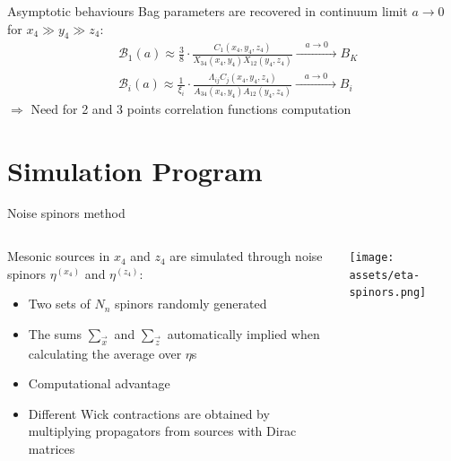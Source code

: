 \documentclass{beamer}
\begin{document}
\begin{frame}{Asymptotic behaviours}
      Bag parameters are recovered in continuum limit $a \rightarrow 0$ for $x_4 \gg y_4 \gg z_4$:
      \begin{equation*}
            \begin{split}
                  & \mathcal{B}_1 (a) \approx \frac{3}{8}\cdot\frac{C_1(x_4,y_4,z_4)}{X_{34}(x_4,y_4)X_{12}(y_4,z_4)} \xrightarrow{ \quad a \rightarrow 0 \quad } B_K \\
                  & \mathcal{B}_i (a) \approx \frac{1}{\xi_i}\cdot\frac{\Lambda_{ij}C_j(x_4,y_4,z_4)}{A_{34}(x_4,y_4)A_{12}(y_4,z_4)} \xrightarrow{ \quad a \rightarrow 0 \quad } B_i
            \end{split}
      \end{equation*}
      $\Rightarrow$ Need for 2 and 3 points correlation functions computation
\end{frame}

\section{Simulation Program}

\begin{frame}{Noise spinors method}
      \begin{columns}
            \begin{column}{0.65\textwidth}
                  Mesonic sources in $x_4$ and $z_4$ are simulated through noise spinors $\eta^{(x_4)}$ and $\eta^{(z_4)}$:
                  \begin{itemize}%
                        \item Two sets of $N_n$ spinors randomly generated
                        \item The sums $\sum_{\vec{x}}$ and $\sum_{\vec{z}}$ automatically implied when calculating the average over $\eta$s
                        \item Computational advantage
                        \item Different Wick contractions are obtained by multiplying propagators from sources with Dirac matrices
                  \end{itemize}
            \end{column}
            \begin{column}{0.35\textwidth}
                  \texttt{[image: assets/eta-spinors.png]}
            \end{column}
      \end{columns}
\end{frame}
\end{document}
